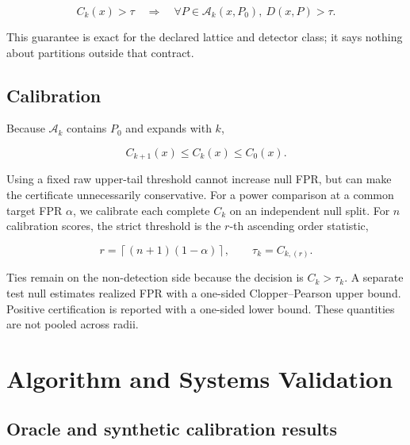 \documentclass[10pt]{article}
\begin{document}
\begin{equation}
C_k(x)>\tau
\quad\Longrightarrow\quad
\forall P\in\mathcal A_k(x,P_0),\ D(x,P)>\tau.
\end{equation}

This guarantee is exact for the declared lattice and detector class; it says
nothing about partitions outside that contract.

\subsection{Calibration}

Because $\mathcal A_k$ contains $P_0$ and expands with $k$,

\begin{equation}
C_{k+1}(x)\leq C_k(x)\leq C_0(x).
\end{equation}

Using a fixed raw upper-tail threshold cannot increase null FPR, but can make
the certificate unnecessarily conservative. For a power comparison at a
common target FPR $\alpha$, we calibrate each complete $C_k$ on an independent
null split. For $n$ calibration scores, the strict threshold is the
$r$-th ascending order statistic,

\begin{equation}
r=\left\lceil(n+1)(1-\alpha)\right\rceil,
\qquad \tau_k=C_{k,(r)}.
\end{equation}

Ties remain on the non-detection side because the decision is
$C_k>\tau_k$. A separate test null estimates realized FPR with a one-sided
Clopper--Pearson upper bound. Positive certification is reported with a
one-sided lower bound. These quantities are not pooled across radii.

\section{Algorithm and Systems Validation}

\subsection{Oracle and synthetic calibration results}
\end{document}
